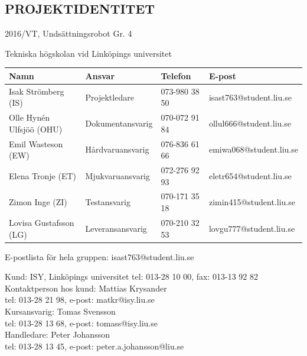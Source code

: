 \documentclass[11pt]{article}
\begin{document}
\pagebreak
\begin{center}

\section*{PROJEKTIDENTITET}
2016/VT, Undsättningsrobot Gr. 4

Tekniska högskolan vid Linköpings universitet
\vspace{5em}

\begin{tabular}{|l|l|l|l|} \hline
\textbf{Namn} & \textbf{Ansvar} & \textbf{Telefon} & \textbf{E-post}  \\ \hline 
Isak Strömberg (IS) & Projektledare & 073-980 38 50 & isast763@student.liu.se \\ \hline
Olle Hynén Ulfsjöö (OHU)& Dokumentansvarig & 070-072 91 84 & ollul666@student.liu.se \\ \hline
Emil Wasteson (EW) & Hårdvaruansvarig & 076-836 61 66 & emiwa068@student.liu.se \\ \hline
Elena Tronje (ET) & Mjukvaruansvarig & 072-276 92 93 & eletr654@student.liu.se \\ \hline
Zimon Inge (ZI)& Testansvarig & 070-171 35 18 & zimin415@student.liu.se \\ \hline
Lovisa Gustafsson (LG) & Leveransansvarig & 070-210 32 53 & lovgu777@student.liu.se \\ \hline
\end{tabular}


E-postlista för hela gruppen: isast763@student.liu.se

\vspace{5em}
Kund: ISY, Linköpings universitet 
tel: 013-28 10 00, fax: 013-13 92 82 \\
Kontaktperson hos kund: Mattias Krysander \\
tel: 013-28 21 98, e-post: matkr@isy.liu.se \\

\vspace{5em}
Kursansvarig:  Tomas Svensson\\
tel: 013-28 13 68, e-post: tomass@isy.liu.se \\
Handledare: Peter Johansson \\
tel: 013-28 13 45, e-post: peter.a.johansson@liu.se
\end{center}
\pagebreak
\end{document}

